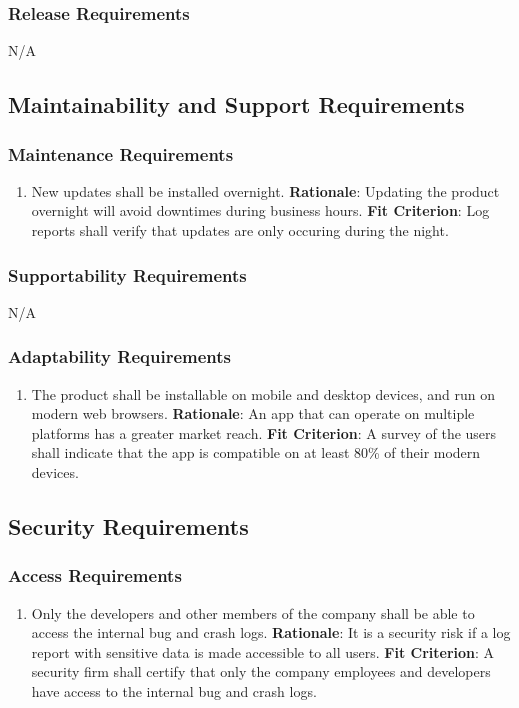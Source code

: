 \documentclass[12pt]{article}
\begin{document}
\subsubsection{Release Requirements}
N/A

\subsection{Maintainability and Support Requirements}
\subsubsection{Maintenance Requirements}
\begin{enumerate}[nfr]
    \item New updates shall be installed overnight.
    \newline \textbf{Rationale}: Updating the product overnight will avoid downtimes during business hours.
    \newline \textbf{Fit Criterion}: Log reports shall verify that updates are only occuring during the night.
\end{enumerate}

\subsubsection{Supportability Requirements}
N/A

\subsubsection{Adaptability Requirements}
\begin{enumerate}[nfr]
    \item The product shall be installable on mobile and desktop devices, and run on modern web browsers.
    \newline \textbf{Rationale}: An app that can operate on multiple platforms has a greater market reach.
    \newline \textbf{Fit Criterion}: A survey of the users shall indicate that the app is compatible on at least 80\% of their modern devices.
\end{enumerate}

\subsection{Security Requirements}
\subsubsection{Access Requirements}
\begin{enumerate}[nfr]
    \item Only the developers and other members of the company shall be able to access the internal bug and crash logs.
    \newline \textbf{Rationale}: It is a security risk if a log report with sensitive data is made accessible to all users.
    \newline \textbf{Fit Criterion}: A security firm shall certify that only the company employees and developers have access to the internal bug and crash logs.
\end{enumerate}
\end{document}
